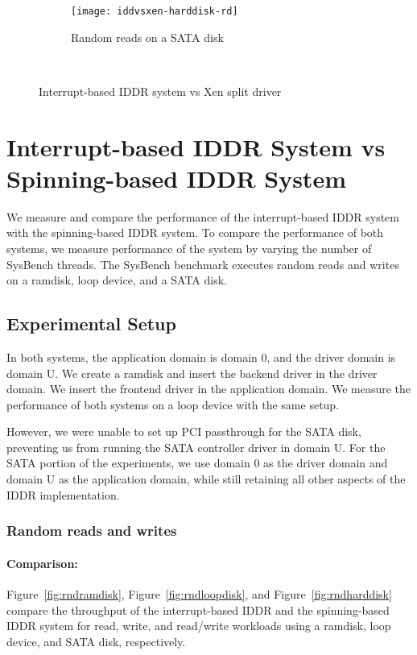 \begin{figure}[H]
  \ContinuedFloat
  \begin{subfigure}[b]{\textwidth}
  \texttt{[image: iddvsxen-harddisk-rd]}
  \caption{Random reads on a SATA disk}
  \label{fig:iddrvsxen-harddisk-rd}
  \end{subfigure}\\
\caption{Interrupt-based IDDR system vs Xen split driver}\label{fig:seqloopdisk}
\end{figure}

\section{Interrupt-based IDDR System vs Spinning-based IDDR System}
We measure and compare the performance of the interrupt-based IDDR system
with the spinning-based IDDR system. To compare the performance of both
systems, we measure performance of the system by varying the number of
SysBench threads. The SysBench benchmark executes random reads and writes 
on a ramdisk, loop device, and a SATA disk.

\subsection*{Experimental Setup}
In both systems, the application domain is domain 0, and the driver domain
is domain U.  We create a ramdisk and insert the backend driver in the
driver domain.  We insert the frontend driver in the application domain.
We measure the performance of both systems on a loop device with the
same setup.

However, we were unable to set up PCI passthrough for the SATA disk,
preventing us from running the SATA controller driver in domain U.
For the SATA portion of the experiments, we use domain 0 as the
driver domain and domain U as the application domain, while still
retaining all other aspects of the IDDR implementation.

\subsubsection*{Random reads and writes}

\paragraph{Comparison:}

Figure~\ref{fig:rndramdisk}, Figure~\ref{fig:rndloopdisk}, and
Figure~\ref{fig:rndharddisk} compare the throughput of the interrupt-based
IDDR and the spinning-based IDDR system for read, write, and read/write
workloads using a ramdisk, loop device, and SATA disk, respectively.

